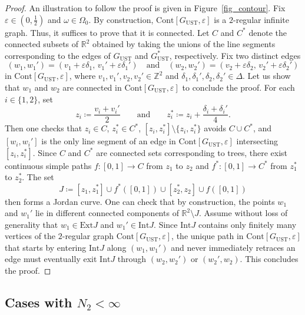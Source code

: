 \documentclass[a4paper, 11pt]{article} %
\theoremstyle{plain}
\newcommand{\Int}{\mathrm{Int}}
\newcommand{\Ext}{\mathrm{Ext}}
\newcommand{\R}{\mathbb{R}}
\newcommand{\Z}{\mathbb{Z}}
\newcommand{\1}{\mathds 1}
\numberwithin{equation}{section}
\begin{document}
\begin{proof}
    An illustration to follow the proof is given in Figure~\ref{fig_contour}. Fix $\varepsilon\in(0,\tfrac12)$ and $\omega\in\Omega_0$. By construction,
    $\mathrm{Cont}[G_\mathrm{UST}, \varepsilon]$ is a $2$-regular infinite graph.
    Thus, it suffices to prove that it is connected. Let $C$ and $C^*$ denote the connected subsets of $\R^2$ obtained by taking the unions of the line segments corresponding to the edges of $G_\mathrm{UST}$ and $G_\mathrm{UST}^*$, respectively. Fix two distinct edges
        \[(w_1,w_1')=(v_1+\varepsilon\delta_1,\,v_1'+\varepsilon\delta_1')\quad\text{and}\quad(w_2,w_2')=(v_2+\varepsilon\delta_2,\,v_2'+\varepsilon\delta_2')\]
    in $\mathrm{Cont}[G_\mathrm{UST}, \varepsilon]$, where
    $v_1,v_1',v_2,v_2'\in\Z^2$ and $\delta_1,\delta_1',\delta_2,\delta_2'\in\Delta$. Let us show that $w_1$ and $w_2$ are connected in $\mathrm{Cont}[G_\mathrm{UST},\varepsilon]$ to conclude the proof. For each $i\in\{1,2\}$, set
        \[z_i\coloneqq \frac{v_i+v_i'}{2}\qquad\text{and}\qquad z_i^*\coloneqq z_i+\frac{\delta_i+\delta_i'}{4}.\]
    Then one checks that $z_i\in C$, $z_i^*\in C^*$, $[z_i,z_i^*]\setminus\{z_i,z_i^*\}$ avoids $C\cup C^*$, and $[w_i,w_i']$ is the only line segment of an edge in $\mathrm{Cont}[G_\mathrm{UST}, \varepsilon]$ intersecting $[z_i,z_i^*]$. Since $C$ and $C^*$ are connected sets corresponding to trees, there exist continuous simple paths $f:[0,1]\to C$ from $z_1$ to $z_2$ and $f^*:[0,1]\to C^*$ from $z_1^*$ to $z_2^*$. The set
        \[J\coloneqq [z_1,z_1^*]\cup f^*([0,1])\cup[z_2^*,z_2]\cup f([0,1])\]
    then forms a Jordan curve. One can check that by construction, the points $w_1$ and $w_1'$ lie in different connected components of $\R^2\setminus J$. Assume without loss of generality that $w_1\in\Ext J$ and $w_1'\in\Int J$. Since $\Int J$ contains only finitely many vertices of the $2$-regular graph $\mathrm{Cont}[G_\mathrm{UST}, \varepsilon]$, the unique path in $\mathrm{Cont}[G_\mathrm{UST}, \varepsilon]$ that starts by entering $\Int J$ along $(w_1,w_1')$ and never immediately retraces an edge must eventually exit $\Int J$ through $(w_2,w_2')$ or $(w_2',w_2)$. This concludes the proof.
\end{proof}


\subsection*{Cases with $N_2<\infty$}
\end{document}
